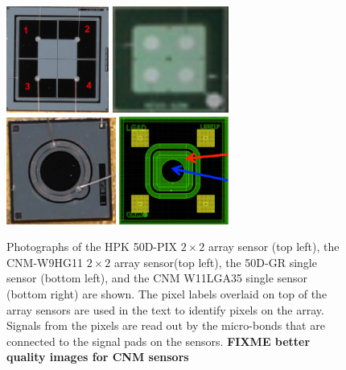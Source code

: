 \documentclass[preprint,1p]{elsarticle}
\begin{document}
\begin{figure}[!htbp] 
\centering
\includegraphics[width=0.3\textwidth]{figs/HPK-50D-PIX.pdf} 
\includegraphics[width=0.34\textwidth]{figs/CNM-W9HG11.pdf} \\
\includegraphics[width=0.32\textwidth]{figs/HPK-50D-GR.pdf} 
\includegraphics[width=0.32\textwidth]{figs/CNM-singlechannel.pdf} 
\caption{Photographs of the HPK 50D-PIX $2\times 2$ array sensor (top left), the CNM-W9HG11 $2\times 2$ 
array sensor(top left), the 50D-GR single sensor (bottom left), and the CNM W11LGA35 single 
sensor (bottom right) are shown. The pixel labels overlaid on top of the array sensors are 
used in the text to identify pixels on the array. Signals from the pixels are read out by 
the micro-bonds that are connected to the signal pads on the sensors. 
\textbf {FIXME better quality images for CNM sensors} } 
\label{fig:HPK_Sensors} 
\end{figure} 
\end{document}
